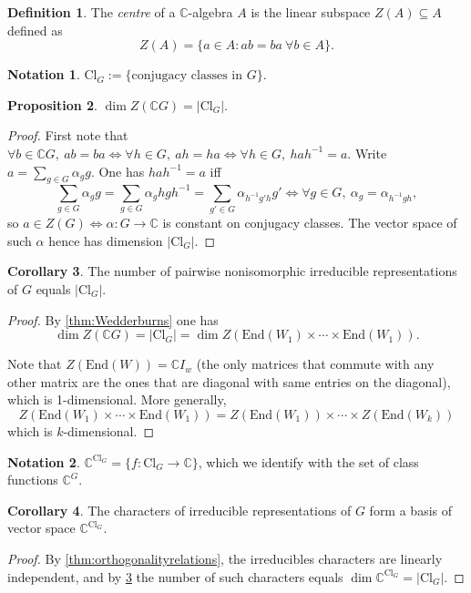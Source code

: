 \documentclass{article}
\newcommand{\C}{\mathbb{C}}
\newcommand{\Cl}{\text{Cl}}
\newcommand{\End}{\text{End}}
\theoremstyle{definition}
\newtheorem{defn}{Definition}[subsection]
\newtheorem{prop}[defn]{Proposition}
\newtheorem{coro}[defn]{Corollary}
\newtheorem*{notation}{Notation}
\begin{document}
\begin{defn}
The \textit{centre} of a $\C$-algebra $A$ is the linear subspace $Z(A)\subseteq A$ defined as
\[
Z(A)=\{a\in A:ab=ba\ \forall b\in A\}.
\]
\end{defn}
\begin{notation}
$\Cl_G:=\{\text{conjugacy classes in }G\}$.
\end{notation}
\begin{prop}
$\dim Z(\C G)=|\Cl_G|$.
\end{prop}
\begin{proof}
First note that $\forall b\in \C G,\ ab=ba\iff \forall h\in G,\ ah=ha\iff \forall h\in G,\ hah^{-1}=a$. Write $a=\sum_{g\in G}\alpha_g g$. One has $hah^{-1}=a$ iff
\[
\sum_{g\in G}\alpha_g g=\sum_{g\in G}\alpha_g hgh^{-1}=\sum_{g'\in G}\alpha_{h^{-1}g'h}g' \iff \forall g\in G,\ \alpha_g=\alpha_{h^{-1}gh},
\]
so $a\in Z(G)\iff\alpha:G\rightarrow\C$ is constant on conjugacy classes. The vector space of such $\alpha$ hence has dimension $|\Cl_G|$.
\end{proof}

\begin{coro}
\label{coro:nofpairwisenonisoirredrepofGisnofclG}
The number of pairwise nonisomorphic irreducible representations of $G$ equals $|\Cl_G|$.
\end{coro}
\begin{proof}
By \ref{thm:Wedderburns} one has
\[
\dim Z(\C G)=|\Cl_G|=\dim Z(\End(W_1)\times\cdots\times\End(W_1)).
\]

Note that $Z(\End(W))=\C I_w$ (the only matrices that commute with any other matrix are the ones that are diagonal with same entries on the diagonal), which is 1-dimensional. More generally,
\[
Z(\End(W_1)\times\cdots\times\End(W_1))=Z(\End(W_1))\times\cdots\times Z(\End(W_k))
\]
which is $k$-dimensional.
\end{proof}

\begin{notation}
$\C^{\Cl_G}=\{f:\Cl_G\rightarrow \C\}$, which we identify with the set of class functions $\C^G$.
\end{notation}

\begin{coro}
The characters of irreducible representations of $G$ form a basis of vector space $\C^{\Cl_G}$.
\end{coro}
\begin{proof}
By \ref{thm:orthogonalityrelations}, the irreducibles characters are linearly independent, and by \ref{coro:nofpairwisenonisoirredrepofGisnofclG} the number of such characters equals $\dim \C^{\Cl_G}=|\Cl_G|$.
\end{proof}
\end{document}
